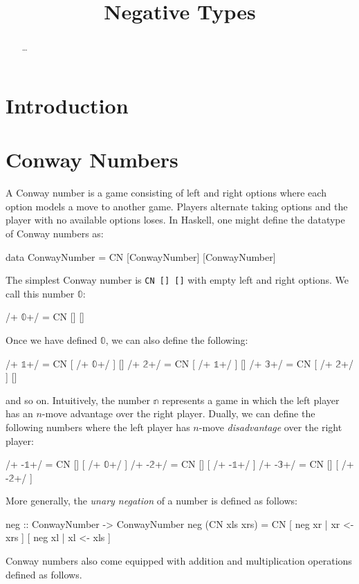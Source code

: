 \documentclass[authoryear,preprint]{sigplanconf}
\newcommand{\zerog}{$\mathbb{0}$}
\newcommand{\oneg}{$\mathbb{1}$}
\newcommand{\twog}{$\mathbb{2}$}
\newcommand{\threeg}{$\mathbb{3}$}
\begin{document}
\title{Negative Types}
\authorinfo{}{}{}
\maketitle

\begin{abstract}
\ldots
\end{abstract}

\section{Introduction}

\section{Conway Numbers}

A Conway number is a game consisting of left and right options where each
option models a move to another game. Players alternate taking options and
the player with no available options loses. In Haskell, one might define the
datatype of Conway numbers as:
\begin{code}
data ConwayNumber = CN [ConwayNumber] [ConwayNumber]
\end{code}
The simplest Conway number is \lstinline|CN [] []| with empty left and right
options. We call this number \zerog: 
\begin{code}
/+ \zerog +/  = CN  [] []
\end{code}
Once we have defined \zerog, we can also define the following:
\begin{code}
/+ \oneg +/  = CN  [ /+ \zerog +/ ]  []
/+ \twog +/  = CN  [ /+ \oneg +/ ]  []
/+ \threeg +/  = CN  [ /+ \twog +/ ]  []
\end{code}
and so on. Intuitively, the number $\mathbb{n}$ represents a game in which
the left player has an $n$-move advantage over the right player. Dually, we
can define the following numbers where the left player has $n$-move
\emph{disadvantage} over the right player:
\begin{code}
/+ -\oneg +/  = CN  [] [ /+ \zerog +/ ]
/+ -\twog +/  = CN  [] [ /+ -\oneg +/ ]
/+ -\threeg +/  = CN  [] [ /+ -\twog +/ ]
\end{code}
More generally, the \emph{unary negation} of a number is defined as follows:
\begin{code}
neg :: ConwayNumber -> ConwayNumber
neg (CN xls xrs) = 
  CN [ neg xr | xr <- xrs ] [ neg xl | xl <- xls ]
\end{code}
Conway numbers also come equipped with addition and multiplication operations
defined as follows. 
\end{document}
